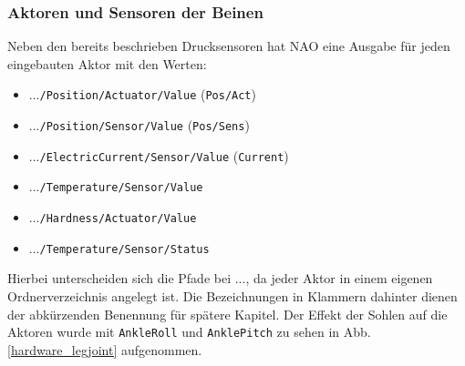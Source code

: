 \subsubsection*{Aktoren und Sensoren der Beinen}
Neben den bereits beschrieben Drucksensoren hat NAO eine Ausgabe für jeden eingebauten Aktor mit den Werten:
\begin{itemize}
	\item ...\texttt{/Position/Actuator/Value} (\texttt{Pos/Act})
	\item ...\texttt{/Position/Sensor/Value} (\texttt{Pos/Sens})
	\item ...\texttt{/ElectricCurrent/Sensor/Value} (\texttt{Current})
	\item ...\texttt{/Temperature/Sensor/Value}
	\item ...\texttt{/Hardness/Actuator/Value} 
	\item ...\texttt{/Temperature/Sensor/Status} 
\end{itemize}
Hierbei unterscheiden sich die Pfade bei \glqq ...\grqq{}, da jeder Aktor in einem eigenen Ordnerverzeichnis angelegt ist. Die Bezeichnungen in Klammern dahinter dienen der abkürzenden Benennung für spätere Kapitel. Der Effekt der Sohlen auf die Aktoren wurde mit \texttt{AnkleRoll} und \texttt{AnklePitch} zu sehen in Abb. \ref{hardware_legjoint} aufgenommen.

